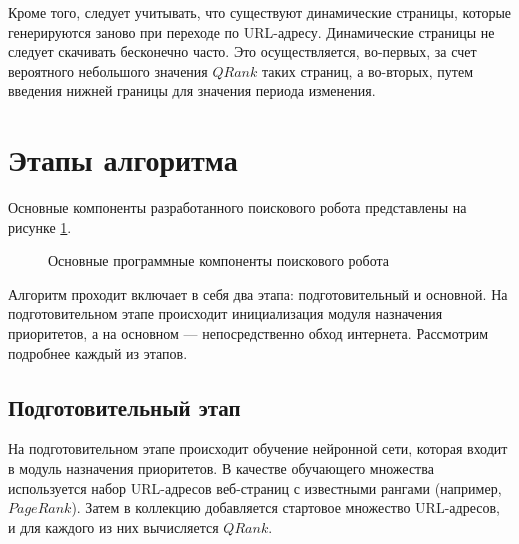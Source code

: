 Кроме того, следует учитывать, что существуют динамические страницы, которые генерируются заново при переходе по URL-адресу. Динамические страницы не следует скачивать бесконечно часто. Это осуществляется, во-первых, за счет вероятного небольшого значения $QRank$ таких страниц, а во-вторых, путем введения нижней границы для значения периода изменения.

\section{Этапы алгоритма}
\label{steps}

Основные компоненты разработанного поискового робота представлены на рисунке \ref{architecture}.

\begin{figure}[h!]
\caption{Основные программные компоненты поискового робота}
\label{architecture}
\end{figure}

Алгоритм проходит включает в себя два этапа: подготовительный  и основной. На подготовительном этапе происходит инициализация модуля назначения приоритетов, а на основном --- непосредственно обход интернета. Рассмотрим подробнее каждый из этапов.

\subsection*{Подготовительный этап}

На подготовительном этапе происходит обучение нейронной сети, которая входит в модуль назначения приоритетов. В качестве обучающего множества используется набор URL-адресов веб-страниц с известными рангами (например, $PageRank$). Затем в коллекцию добавляется стартовое множество URL-адресов, и для каждого из них вычисляется $QRank$.

